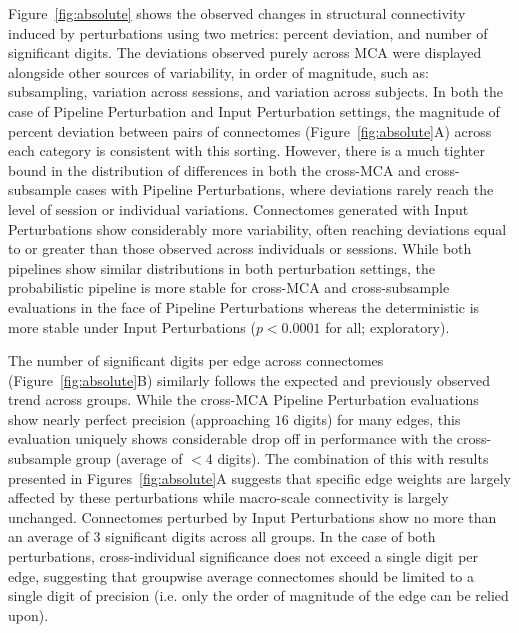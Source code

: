 \documentclass[fleqn,10pt]{SelfArx} %
\begin{document}
Figure~\ref{fig:absolute} shows the observed changes in structural connectivity induced by perturbations using two
metrics: percent deviation, and number of significant digits. The deviations observed purely across MCA were displayed
alongside other sources of variability, in order of magnitude, such as: subsampling, variation across sessions, and
variation across subjects. In both the case of Pipeline Perturbation and Input Perturbation settings, the magnitude of
percent deviation between pairs of connectomes (Figure~\ref{fig:absolute}A) across each category is consistent with
this sorting. However, there is a much tighter bound in the distribution of differences in both the cross-MCA and
cross-subsample cases with Pipeline Perturbations, where deviations rarely reach the level of session or individual
variations. Connectomes generated with Input Perturbations show considerably more variability, often reaching
deviations equal to or greater than those observed across individuals or sessions. While both pipelines show similar
distributions in both perturbation settings, the probabilistic pipeline is more stable for cross-MCA and
cross-subsample evaluations in the face of Pipeline Perturbations whereas the deterministic is more stable under Input
Perturbations ($p < 0.0001$ for all; exploratory).

The number of significant digits per edge across connectomes (Figure~\ref{fig:absolute}B) similarly follows the
expected and previously observed trend across groups. While the cross-MCA Pipeline Perturbation evaluations show nearly
perfect precision (approaching $16$ digits) for many edges, this evaluation uniquely shows considerable drop off in
performance with the cross-subsample group (average of $< 4$ digits). The combination of this with results presented in
Figures~\ref{fig:absolute}A suggests that specific edge weights are largely affected by these perturbations while
macro-scale connectivity is largely unchanged. Connectomes perturbed by Input Perturbations show no more than an
average of $3$ significant digits across all groups. In the case of both perturbations, cross-individual significance
does not exceed a single digit per edge, suggesting that groupwise average connectomes should be limited to a single
digit of precision (i.e. only the order of magnitude of the edge can be relied upon).
\end{document}
